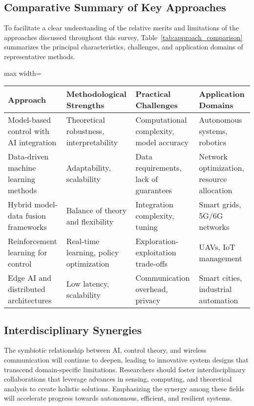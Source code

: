 \documentclass[sigconf]{acmart}
\begin{document}
\subsection{Comparative Summary of Key Approaches}

To facilitate a clear understanding of the relative merits and limitations of the approaches discussed throughout this survey, Table~\ref{tab:approach_comparison} summarizes the principal characteristics, challenges, and application domains of representative methods.

\begin{table*}[htbp]
\centering
\caption{Comparative summary of key AI-based control and wireless methodologies}
\label{tab:approach_comparison}
\begin{adjustbox}{max width=\textwidth}
\begin{tabular}{@{}llll@{}}
\toprule
Approach & Methodological Strengths & Practical Challenges & Application Domains \\
\midrule
Model-based control with AI integration & Theoretical robustness, interpretability & Computational complexity, model accuracy & Autonomous systems, robotics \\
Data-driven machine learning methods & Adaptability, scalability & Data requirements, lack of guarantees & Network optimization, resource allocation \\
Hybrid model-data fusion frameworks & Balance of theory and flexibility & Integration complexity, tuning & Smart grids, 5G/6G networks \\
Reinforcement learning for control & Real-time learning, policy optimization & Exploration-exploitation trade-offs & UAVs, IoT management \\
Edge AI and distributed architectures & Low latency, scalability & Communication overhead, privacy & Smart cities, industrial automation \\
\bottomrule
\end{tabular}
\end{adjustbox}
\end{table*}

\subsection{Interdisciplinary Synergies}

The symbiotic relationship between AI, control theory, and wireless communication will continue to deepen, leading to innovative system designs that transcend domain-specific limitations. Researchers should foster interdisciplinary collaborations that leverage advances in sensing, computing, and theoretical analysis to create holistic solutions. Emphasizing the synergy among these fields will accelerate progress towards autonomous, efficient, and resilient systems.
\end{document}
